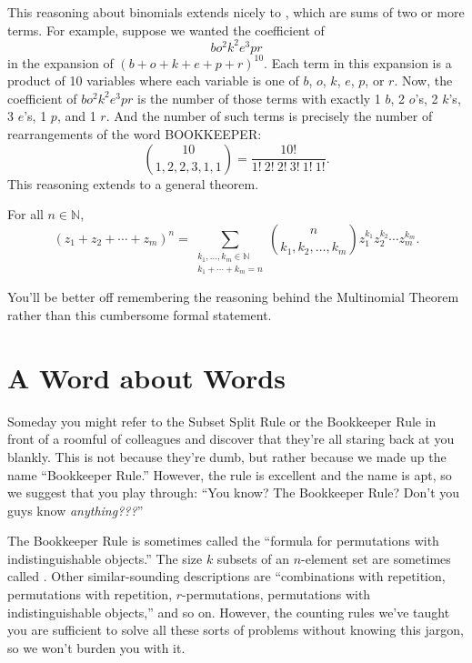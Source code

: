 This reasoning about binomials extends nicely to ,
which are sums of two or more terms.  For example, suppose we wanted
the coefficient of
%
\[
b o^2 k^2 e^3 p r
\]
%
in the expansion of $(b + o + k + e + p + r)^{10}$.  Each term in this
expansion is a product of 10 variables where each variable is one of
$b$, $o$, $k$, $e$, $p$, or $r$.  Now, the coefficient of $b o^2 k^2
e^3 p r$ is the number of those terms with exactly 1 $b$, 2 $o$'s, 2
$k$'s, 3 $e$'s, 1 $p$, and 1 $r$.  And the number of such terms is
precisely the number of rearrangements of the word BOOKKEEPER:
\[
\binom{10}{1,2,2,3,1,1} = \frac{10!}{1!\ 2!\ 2!\ 3!\ 1!\ 1!}.
\]
This reasoning extends to a general theorem.

\begin{theorem}\label{multinom-thm}
For all $n \in \mathbb{N}$,
\[
(z_1 + z_2 + \cdots + z_m)^n =
   \sum_{\substack{k_1, \dots, k_m \in \mathbb{N} \\
                   k_1 + \cdots + k_m = n}}
   \binom{n}{k_1, k_2, \dots, k_m} z_1^{k_1} z_2^{k_2} \cdots z_m^{k_m}.
\]
\end{theorem}
You'll be better off remembering the reasoning behind the Multinomial
Theorem rather than this cumbersome formal statement.

\begin{problems}

\practiceproblems
{}

\classproblems
{}

\homeworkproblems
{}

\end{problems}

\section{A Word about Words}

Someday you might refer to the Subset Split Rule or the Bookkeeper Rule
in front of a roomful of colleagues and discover that they're all staring
back at you blankly.  This is not because they're dumb, but rather because
we made up the name ``Bookkeeper Rule.''  However, the rule is excellent
and the name is apt, so we suggest that you play through: ``You know?  The
Bookkeeper Rule?  Don't you guys know \emph{anything???}''

The Bookkeeper Rule is sometimes called the ``formula for permutations
with indistinguishable objects.''  The size $k$ subsets of an $n$-element
set are sometimes called .  Other similar-sounding
descriptions are ``combinations with repetition, permutations with
repetition, $r$-permutations, permutations with indistinguishable
objects,'' and so on.  However, the counting rules we've taught you are
sufficient to solve all these sorts of problems without knowing this
jargon, so we won't burden you with it.

